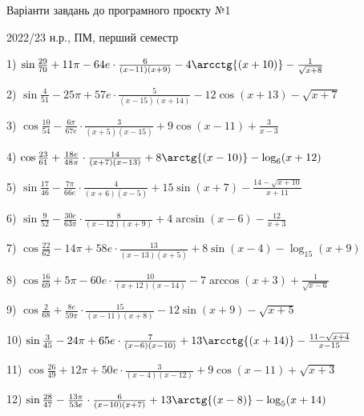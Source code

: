 \documentclass[11pt,ukrainian]{article}
\begin{document}
{\Large \center  Варіанти завдань до програмного проєкту №1\par 2022/23 н.р., ПМ, перший семестр\par \bigskip}
1) \space 
{ ${\sin\frac{29}{70}} + 11{\pi} - 64 e\cdot {\frac{6}{(x - 11)(x + 9)}} - {4\arcctg{(x + 10)}} - {\frac{1}{\sqrt{x + 8}}}$}
\smallskip\par
2) \space 
{ ${\sin\frac{4}{51}} - 25{\pi} + 57 e\cdot {\frac{5}{(x - 15)(x + 14)}} - {12\cos{(x + 13)}} - {\sqrt{x + 7}}$}
\smallskip\par
3) \space 
{ ${\cos\frac{10}{54}} - \frac{6{\pi}}{67 e}\cdot {\frac{3}{(x + 5)(x - 15)}} + {9\cos{(x - 11)}} + { \frac{3}{x - 3}}$}
\smallskip\par
4) \space 
{ ${\cos\frac{23}{61}} + \frac{18 e}{48{\pi}}\cdot {\frac{14}{(x + 7)(x - 13)}} + {8\arctg{(x - 10)}} - {\log_{6}(x + 12)}$}
\smallskip\par
5) \space 
{ ${\sin\frac{17}{46}} - \frac{7{\pi}}{66 e}\cdot {\frac{4}{(x + 6)(x - 5)}} + {15\sin{(x + 7)}} - {\frac{14 - \sqrt{x + 10}}{x + 11}}$}
\smallskip\par
6) \space 
{ ${\sin\frac{9}{52}} - \frac{30 e}{63{\pi}}\cdot {\frac{8}{(x - 12)(x + 9)}} + {4\arcsin{(x - 6)}} - { \frac{12}{x + 3}}$}
\smallskip\par
7) \space 
{ ${\cos\frac{22}{62}} - 14{\pi} + 58 e\cdot {\frac{13}{(x - 13)(x + 5)}} + {8\sin{(x - 4)}} - {\log_{15}(x + 9)}$}
\smallskip\par
8) \space 
{ ${\cos\frac{16}{69}} + 5{\pi} - 60 e\cdot {\frac{10}{(x + 12)(x - 14)}} - {7\arccos{(x + 3)}} + {\frac{1}{\sqrt{x - 6}}}$}
\smallskip\par
9) \space 
{ ${\cos\frac{2}{68}} + \frac{8 e}{59{\pi}}\cdot {\frac{15}{(x - 11)(x + 8)}} - {12\sin{(x + 9)}} - {\sqrt{x + 5}}$}
\smallskip\par
10) \space 
{ ${\sin\frac{3}{45}} - 24{\pi} + 65 e\cdot {\frac{7}{(x - 6)(x - 10)}} + {13\arcctg{(x + 14)}} - {\frac{11 - \sqrt{x + 4}}{x - 15}}$}
\smallskip\par
11) \space 
{ ${\cos\frac{26}{49}} + 12{\pi} + 50 e\cdot {\frac{3}{(x - 4)(x - 12)}} + {9\cos{(x - 11)}} + {\sqrt{x + 3}}$}
\smallskip\par
12) \space 
{ ${\sin\frac{28}{47}} - \frac{13{\pi}}{53 e}\cdot {\frac{6}{(x - 10)(x + 7)}} + {13\arctg{(x - 8)}} - {\log_{5}(x + 14)}$}
\smallskip\par
\end{document}
